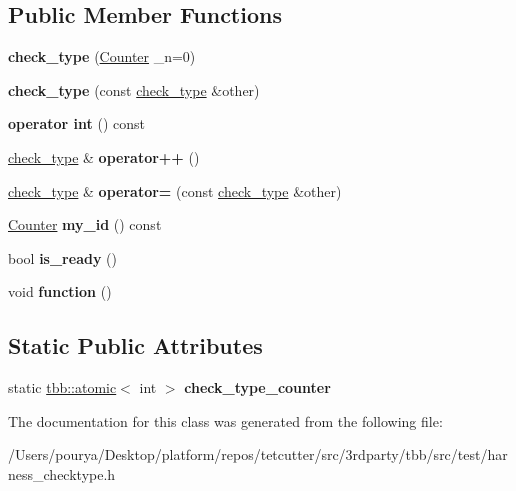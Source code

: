 \subsection*{Public Member Functions}
\begin{DoxyCompactItemize}
\item 
\hypertarget{classcheck__type_a67ab74c9855d9184552ef8edbee0b0a1}{}{\bfseries check\+\_\+type} (\hyperlink{structCounter}{Counter} \+\_\+n=0)\label{classcheck__type_a67ab74c9855d9184552ef8edbee0b0a1}

\item 
\hypertarget{classcheck__type_aea7ede415415adef50a419d26cb3dc29}{}{\bfseries check\+\_\+type} (const \hyperlink{classcheck__type}{check\+\_\+type} \&other)\label{classcheck__type_aea7ede415415adef50a419d26cb3dc29}

\item 
\hypertarget{classcheck__type_a6ba574fb60a45c29e908346f1b913fac}{}{\bfseries operator int} () const \label{classcheck__type_a6ba574fb60a45c29e908346f1b913fac}

\item 
\hypertarget{classcheck__type_a0a10467e8ae77c5f8db1f64626a3aadb}{}\hyperlink{classcheck__type}{check\+\_\+type} \& {\bfseries operator++} ()\label{classcheck__type_a0a10467e8ae77c5f8db1f64626a3aadb}

\item 
\hypertarget{classcheck__type_a72462c23ad1b6ef1f37437637e3742b2}{}\hyperlink{classcheck__type}{check\+\_\+type} \& {\bfseries operator=} (const \hyperlink{classcheck__type}{check\+\_\+type} \&other)\label{classcheck__type_a72462c23ad1b6ef1f37437637e3742b2}

\item 
\hypertarget{classcheck__type_a10a5638b49d60cce2d6b242eea1406d5}{}\hyperlink{structCounter}{Counter} {\bfseries my\+\_\+id} () const \label{classcheck__type_a10a5638b49d60cce2d6b242eea1406d5}

\item 
\hypertarget{classcheck__type_ae89a2a8596b9fb4b683b912d72a3a1f5}{}bool {\bfseries is\+\_\+ready} ()\label{classcheck__type_ae89a2a8596b9fb4b683b912d72a3a1f5}

\item 
\hypertarget{classcheck__type_aa51bd124f04b1af780cfa53ebfb335e8}{}void {\bfseries function} ()\label{classcheck__type_aa51bd124f04b1af780cfa53ebfb335e8}

\end{DoxyCompactItemize}
\subsection*{Static Public Attributes}
\begin{DoxyCompactItemize}
\item 
\hypertarget{classcheck__type_a1a68cfe7e272a3c4c3dda8f8c5dc147c}{}static \hyperlink{structtbb_1_1atomic}{tbb\+::atomic}$<$ int $>$ {\bfseries check\+\_\+type\+\_\+counter}\label{classcheck__type_a1a68cfe7e272a3c4c3dda8f8c5dc147c}

\end{DoxyCompactItemize}


The documentation for this class was generated from the following file\+:\begin{DoxyCompactItemize}
\item 
/\+Users/pourya/\+Desktop/platform/repos/tetcutter/src/3rdparty/tbb/src/test/harness\+\_\+checktype.\+h\end{DoxyCompactItemize}
